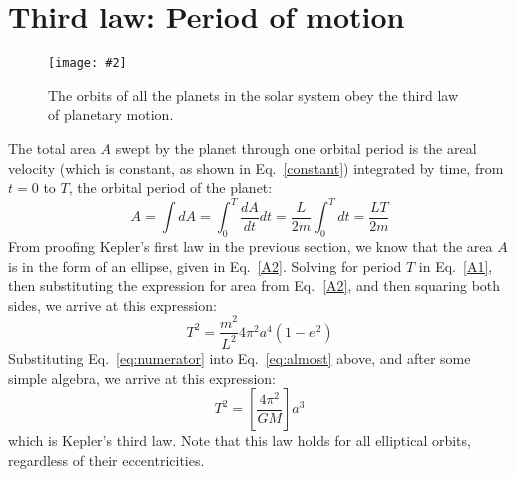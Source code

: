 \documentclass[11pt]{article}
\newcommand{\pic}[2]{
  \texttt{[image: \#2]}
}
\begin{document}
\section{Third law: Period of motion}
\begin{figure}[!ht]
  \centering
  \pic{.55}{../kep8.png}
  \caption{The orbits of all the planets in the solar system obey the third
  law of planetary motion.}
  \label{3rdlaw}
\end{figure}
The total area $A$ swept by the planet through one orbital period is the areal
velocity (which is constant, as shown in Eq.\ \ref{constant}) integrated by
time, from $t=0$ to $T$, the orbital period of the planet:
\begin{equation}
  A=\int dA=\int_0^T\frac{dA}{dt}dt=\frac{L}{2m}\int_0^Tdt=\frac{LT}{2m}
  \label{A1}
\end{equation}
From proofing Kepler's first law in the previous section, we know that the
area $A$ is in the form of an ellipse, given in Eq.~\ref{A2}. Solving for
period $T$ in Eq.~\ref{A1}, then substituting the expression for area from
Eq.~\ref{A2}, and then squaring both sides, we arrive at this expression:
\begin{equation}
  T^2=\frac{m^2}{L^2}4\pi^2a^4(1-e^2)
  \label{eq:almost}
\end{equation}
Substituting Eq.~\ref{eq:numerator}
into Eq.\ \ref{eq:almost} above, and after some simple algebra, we arrive at
this expression:
\begin{equation}
  \boxed{T^2=\left[\frac{4\pi^2}{GM}\right] a^3}
\end{equation}
which is Kepler's third law. Note that this law holds for all elliptical
orbits, regardless of their eccentricities.
\end{document}
